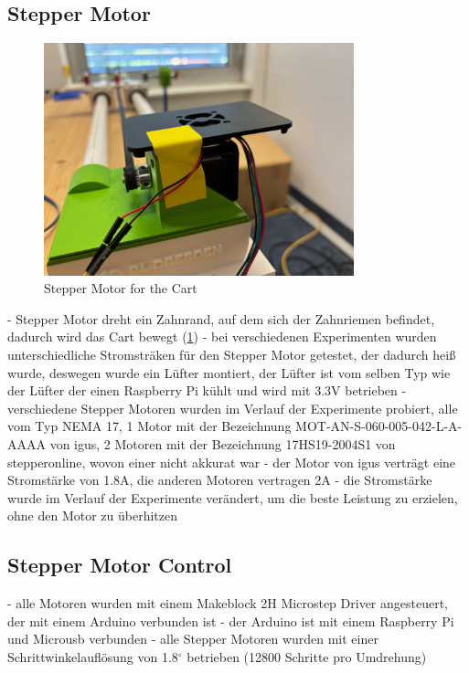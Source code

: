 \subsection{Stepper Motor}
\begin{figure}[htbp]
    \centering
    \includegraphics[width=0.8\textwidth]{img/stepper_motor.jpg}
    \caption{Stepper Motor for the Cart}
    \label{fig:stepper_motor}
\end{figure}
- Stepper Motor dreht ein Zahnrand, auf dem sich der Zahnriemen befindet, dadurch wird das Cart bewegt (\ref{fig:stepper_motor})
- bei verschiedenen Experimenten wurden unterschiedliche Stromsträken für den Stepper Motor getestet, der dadurch heiß wurde, deswegen wurde ein Lüfter montiert, der Lüfter ist vom selben Typ wie der Lüfter der einen Raspberry Pi kühlt und wird mit 3.3V betrieben
- verschiedene Stepper Motoren wurden im Verlauf der Experimente probiert, alle vom Typ NEMA 17, 1 Motor mit der Bezeichnung MOT-AN-S-060-005-042-L-A-AAAA von igus, 2 Motoren mit der Bezeichnung 17HS19-2004S1 von stepperonline, wovon einer nicht akkurat war
- der Motor von igus verträgt eine Stromstärke von 1.8A, die anderen Motoren vertragen 2A
- die Stromstärke wurde im Verlauf der Experimente verändert, um die beste Leistung zu erzielen, ohne den Motor zu überhitzen

\subsection{Stepper Motor Control}
- alle Motoren wurden mit einem Makeblock 2H Microstep Driver angesteuert, der mit einem Arduino verbunden ist
- der Arduino ist mit einem Raspberry Pi und Microusb verbunden
- alle Stepper Motoren wurden mit einer Schrittwinkelauflösung von 1.8$^\circ$ betrieben (12800 Schritte pro Umdrehung)

